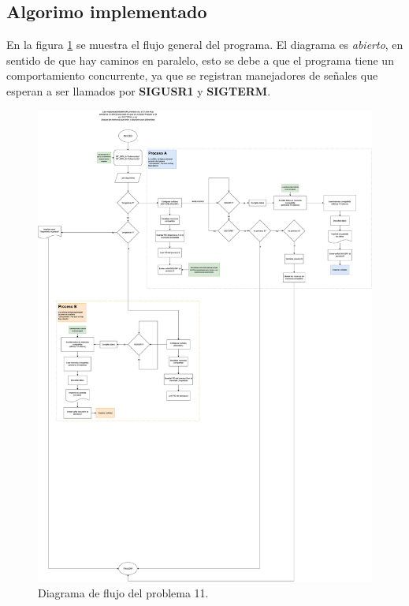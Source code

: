 \documentclass[letterpaper, 10 pt, conference]{ieeeconf}  %
\begin{document}
\subsection{Algorimo implementado}
En la figura \ref{fig:diag_flujo_p11} se muestra el flujo general del programa. El diagrama es \textit{abierto}, en sentido de que hay caminos en paralelo, esto se debe a que el programa tiene un comportamiento concurrente, ya que se registran manejadores de señales que esperan a ser llamados por \textbf{SIGUSR1} y \textbf{SIGTERM}.
\begin{figure}[tb]
  \centering
  \includegraphics[width=\textwidth]{./diagrama_flujo_tp2_p11.png}
  \caption{Diagrama de flujo del problema 11.}
  \label{fig:diag_flujo_p11}
\end{figure}
\end{document}
